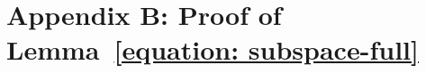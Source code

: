 \documentclass{article} %
\begin{document}





\section{Appendix B: Proof of Lemma~\ref{equation: subspace-full}}



\end{document}
